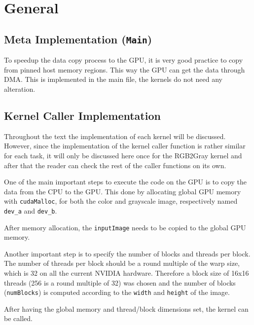 \documentclass[final]{report}
\begin{document}
\chapter{General}

\section{Meta Implementation (\texttt{Main})}
To speedup the data copy process to the GPU, it is very good practice to copy from pinned host memory regions.
This way the GPU can get the data through DMA.
This is implemented in the main file, the kernels do not need any alteration.

\section{Kernel Caller Implementation}
Throughout the text the implementation of each kernel will be discussed.
However, since the implementation of the kernel caller function is rather similar for each task, it will only be discussed here once for the RGB2Gray kernel and after that the reader can check the rest of the caller functions on its own.

One of the main important steps to execute the code on the GPU is to copy the data from the CPU to the GPU.
This done by allocating global GPU memory with \texttt{cudaMalloc}, for both the color and grayscale image, respectively named \texttt{dev\_a} and \texttt{dev\_b}.

After memory allocation, the \texttt{inputImage} needs to be copied to the global GPU memory.


Another important step is to specify the number of blocks and threads per block.
The number of threads per block should be a round multiple of the warp size, which is 32 on all the current NVIDIA hardware.
Therefore a block size of 16x16 threads (256 is a round multiple of 32) was chosen and the number of blocks (\texttt{numBlocks}) is computed according to the \texttt{width} and \texttt{height} of the image.


After having the global memory and thread/block dimensions set, the kernel can be called.

\end{document}

